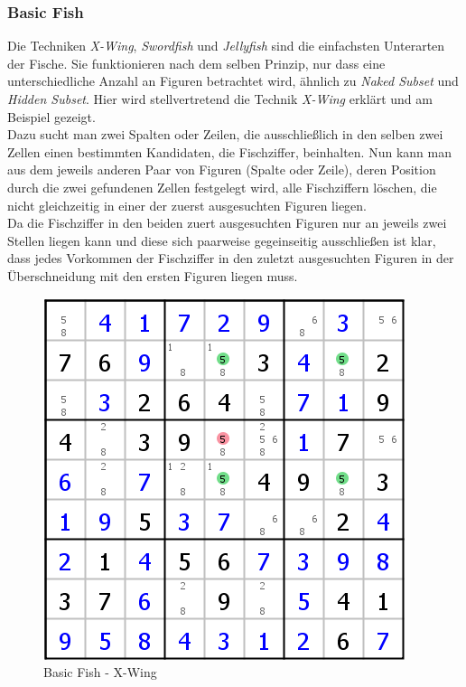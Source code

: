 \newpage
\subsubsection{Basic Fish}
\label{X-Wing}
Die Techniken \textit{X-Wing}, \textit{Swordfish} und \textit{Jellyfish} sind die einfachsten Unterarten der Fische. Sie funktionieren nach dem selben Prinzip, nur dass eine unterschiedliche Anzahl an Figuren betrachtet wird, ähnlich zu \textit{Naked Subset} und \textit{Hidden Subset}. Hier wird stellvertretend die Technik \textit{X-Wing} erklärt und am Beispiel gezeigt.\\
Dazu sucht man zwei Spalten oder Zeilen, die ausschließlich in den selben zwei Zellen einen bestimmten Kandidaten, die Fischziffer, beinhalten. Nun kann man aus dem jeweils anderen Paar von Figuren (Spalte oder Zeile), deren Position durch die zwei gefundenen Zellen festgelegt wird, alle Fischziffern löschen, die nicht gleichzeitig in einer der zuerst ausgesuchten Figuren liegen.\\
Da die Fischziffer in den beiden zuert ausgesuchten Figuren nur an jeweils zwei Stellen liegen kann und diese sich paarweise gegeinseitig ausschließen ist klar, dass jedes Vorkommen der Fischziffer in den zuletzt ausgesuchten Figuren in der Überschneidung mit den ersten Figuren liegen muss.

\begin{figure}[h]
\begin{center}
\includegraphics{./img/x_wing.png}
\caption{Basic Fish - X-Wing}
\end{center}
\end{figure}

